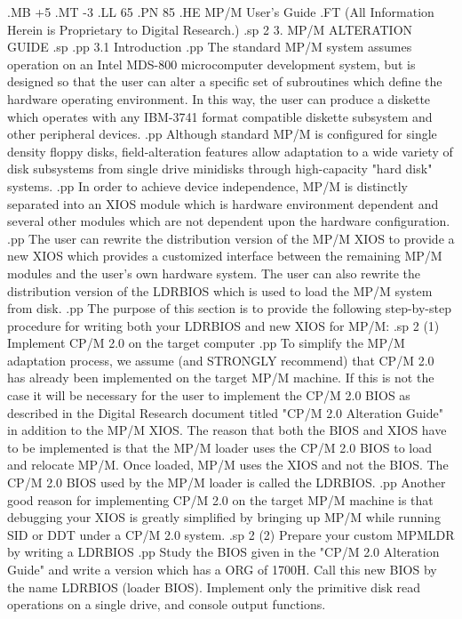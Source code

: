 .MB +5
.MT -3
.LL 65
.PN 85
.HE MP/M User's Guide
.FT   (All Information Herein is Proprietary to Digital Research.)
.sp 2
3.  MP/M ALTERATION GUIDE
.sp
.pp
3.1 Introduction
.pp
The standard MP/M system assumes operation on an Intel MDS-800
microcomputer development system, but is designed so that the user
can alter a specific set of subroutines which define the hardware
operating environment.  In this way, the user can produce a diskette
which operates with any IBM-3741 format compatible diskette subsystem
and other peripheral devices.
.pp
Although standard MP/M is configured for single density
floppy disks, field-alteration features allow adaptation to
a wide variety of disk subsystems from single drive minidisks
through high-capacity "hard disk" systems.
.pp
In order to achieve device independence, MP/M is distinctly separated
into an XIOS module which is hardware environment dependent and
several other modules which are not dependent upon the hardware
configuration.
.pp
The user can rewrite the distribution version of the
MP/M XIOS to provide a new XIOS which provides a customized interface
between the remaining MP/M modules and the user's own hardware
system.  The user can also rewrite the distribution version of the
LDRBIOS which is used to load the MP/M system from disk.
.pp
The purpose of this section is to provide the following step-by-step
procedure for writing both your LDRBIOS and new XIOS for MP/M:
.sp 2
(1)  Implement CP/M 2.0 on the target computer
.pp
To simplify the MP/M adaptation process, we assume (and STRONGLY
recommend) that CP/M 2.0
has already been implemented on the target MP/M machine.
If this is not the case it will be necessary for the user to
implement the CP/M 2.0 BIOS as described in the Digital Research
document titled "CP/M 2.0 Alteration Guide" in addition to the
MP/M XIOS.
The reason that both the BIOS and XIOS have to be implemented is
that the MP/M loader uses the CP/M 2.0 BIOS to load and relocate
MP/M.  Once loaded, MP/M uses the XIOS and not the BIOS.
The CP/M 2.0 BIOS used by the MP/M loader is called the LDRBIOS.
.pp
Another good reason for implementing CP/M 2.0 on the target MP/M
machine is that debugging your XIOS is greatly simplified by
bringing up MP/M while running SID or DDT under a CP/M 2.0 system.
.sp 2
(2)  Prepare your custom MPMLDR by writing a LDRBIOS
.pp
Study the BIOS given in the "CP/M 2.0 Alteration Guide"
and write a version which has a ORG of 1700H.
Call this new BIOS by the
name LDRBIOS (loader BIOS).  Implement only the primitive disk
read operations on a single drive, and console output
functions.
